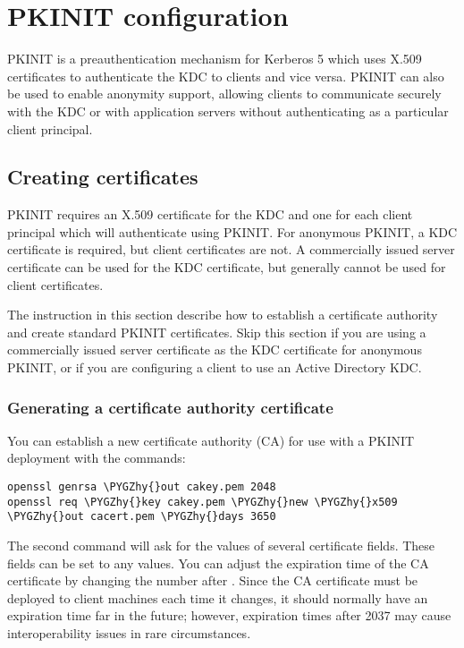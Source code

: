 \documentclass[letterpaper,10pt,english]{sphinxmanual}
\def\PYGZhy{\char`\-}
\begin{document}
\chapter{PKINIT configuration}
\label{admin/pkinit:pkinit-configuration}\label{admin/pkinit:pkinit}\label{admin/pkinit::doc}
PKINIT is a preauthentication mechanism for Kerberos 5 which uses
X.509 certificates to authenticate the KDC to clients and vice versa.
PKINIT can also be used to enable anonymity support, allowing clients
to communicate securely with the KDC or with application servers
without authenticating as a particular client principal.


\section{Creating certificates}
\label{admin/pkinit:creating-certificates}
PKINIT requires an X.509 certificate for the KDC and one for each
client principal which will authenticate using PKINIT.  For anonymous
PKINIT, a KDC certificate is required, but client certificates are
not.  A commercially issued server certificate can be used for the KDC
certificate, but generally cannot be used for client certificates.

The instruction in this section describe how to establish a
certificate authority and create standard PKINIT certificates.  Skip
this section if you are using a commercially issued server certificate
as the KDC certificate for anonymous PKINIT, or if you are configuring
a client to use an Active Directory KDC.


\subsection{Generating a certificate authority certificate}
\label{admin/pkinit:generating-a-certificate-authority-certificate}
You can establish a new certificate authority (CA) for use with a
PKINIT deployment with the commands:

\begin{Verbatim}[commandchars=\\\{\}]
openssl genrsa \PYGZhy{}out cakey.pem 2048
openssl req \PYGZhy{}key cakey.pem \PYGZhy{}new \PYGZhy{}x509 \PYGZhy{}out cacert.pem \PYGZhy{}days 3650
\end{Verbatim}

The second command will ask for the values of several certificate
fields.  These fields can be set to any values.  You can adjust the
expiration time of the CA certificate by changing the number after
.  Since the CA certificate must be deployed to client
machines each time it changes, it should normally have an expiration
time far in the future; however, expiration times after 2037 may cause
interoperability issues in rare circumstances.
\end{document}
